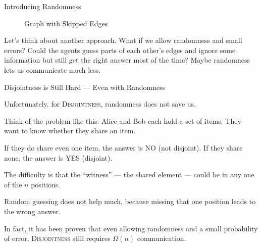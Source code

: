 \begin{block}{Introducing Randomness}
\begin{figure}
\caption{Graph with Skipped Edges}
\end{figure}

\end{block}

Let’s think about another approach. What if we allow randomness and small errors? Could the agents guess parts of each other’s edges and ignore some information but still get the right answer most of the time? Maybe randomness lets us communicate much less.

\begin{block}{Disjointness is Still Hard — Even with Randomness}

Unfortunately, for \textsc{Disjointness}, randomness does not save us.

Think of the problem like this:
Alice and Bob each hold a set of items.
They want to know whether they share an item.

If they do share even one item,
the answer is NO (not disjoint).
If they share none,
the answer is YES (disjoint).

The difficulty is that the “witness” —
the shared element —
could be in any one of the $n$ positions.

Random guessing does not help much,
because missing that one position leads to the wrong answer.

In fact, it has been proven that even allowing randomness
and a small probability of error,
\textsc{Disjointness} still requires $\Omega(n)$ communication.
\end{block}

